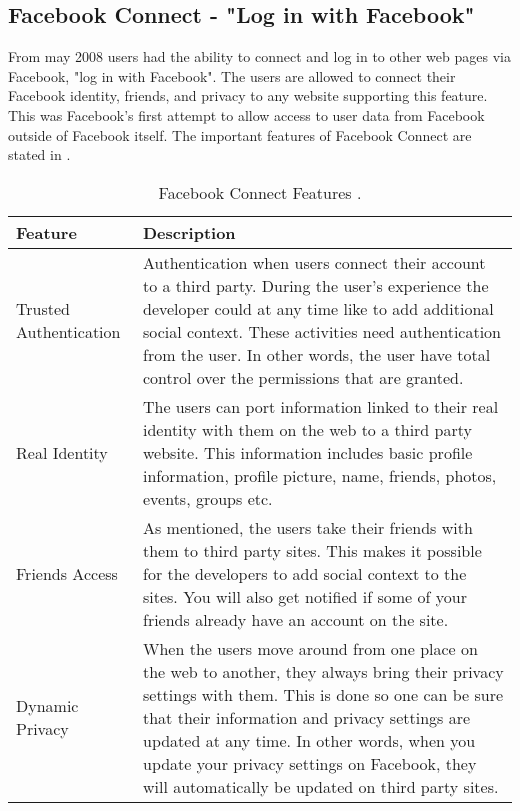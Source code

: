 \subsection{Facebook Connect - "Log in with Facebook"}
From may 2008 users had the ability to connect and log in to other web pages via Facebook, "log in with Facebook". The users are allowed to connect their Facebook identity, friends, and privacy to any website supporting this feature. This was Facebook's first attempt to allow access to user data from Facebook outside of Facebook itself. The important features of Facebook Connect are stated in .

\begin{center}
\begin{table}[!ht]
\caption{\label{tab:connect}Facebook Connect Features \cite{connect, connect2}.}
    \begin{tabular}{ | l | p{9cm} |}
    \hline
    \textbf{Feature} & \textbf{Description} \\ 
    \hline
    Trusted Authentication & Authentication when users connect their account to a third party. During the user's experience the developer could at any time like to add additional social context. These activities need authentication from the user. In other words, the user have total control over the permissions that are granted. \\ 
    \hline
    Real Identity &  The users can port information linked to their real identity with them on the web to a third party website. This information includes basic profile information, profile picture, name, friends, photos, events, groups etc. \\ 
    \hline
    Friends Access & As mentioned, the users take their friends with them to third party sites. This makes it possible for the developers to add social context to the sites. You will also get notified if some of your friends already have an account on the site.\\
    \hline
    Dynamic Privacy & When the users move around from one place on the web to another, they always bring their privacy settings with them. This is done so one can be sure that their information and privacy settings are updated at any time. In other words, when you update your privacy settings on Facebook, they will automatically be updated on third party sites.\\
	\hline
    \end{tabular}
   \end{table}
\end{center}



